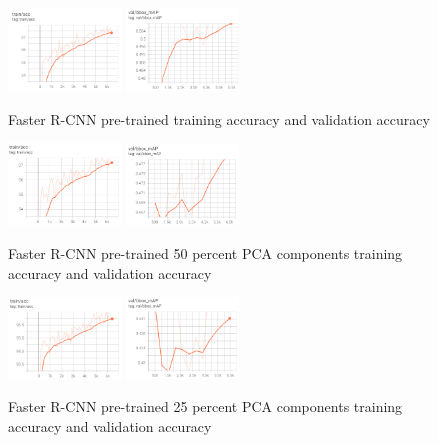 \documentclass[10pt,twocolumn,letterpaper]{article}
\begin{document}
\begin{figure}[ht]
    \centering
    {{\includegraphics[width=3cm]{docs/latex/images/larry/pre_base_results_train_acc.png} }}
    \qquad
    {{\includegraphics[width=3cm]{docs/latex/images/larry/pre_base_results_val.png} }}
    \caption{Faster R-CNN pre-trained training accuracy and validation accuracy}
    \label{fig:example4}
\end{figure}

\begin{figure}[ht]
    \centering
    {{\includegraphics[width=3cm]{docs/latex/images/larry/pre_50_results_train_acc.png} }}
    \qquad
    {{\includegraphics[width=3cm]{docs/latex/images/larry/pre_50_results_val.png} }}
    \caption{Faster R-CNN pre-trained 50 percent PCA components training accuracy and validation accuracy}
    \label{fig:example5}
\end{figure}

\begin{figure}[ht]
    \centering
    {{\includegraphics[width=3cm]{docs/latex/images/larry/pre_25_results_train_acc.png} }}
    \qquad
    {{\includegraphics[width=3cm]{docs/latex/images/larry/pre_25_results_val.png} }}
    \caption{Faster R-CNN pre-trained 25 percent PCA components training accuracy and validation accuracy}
    \label{fig:example6}
\end{figure}
\end{document}
